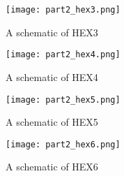 \documentclass{article}
\begin{document}
\begin{enumerate}
\begin{figure}[ht!]
    \centering
    \texttt{[image: part2\_hex3.png]}
    \caption{A schematic of HEX3}
    \label{f:part2_hex3}
\end{figure}

\begin{figure}[ht!]
    \centering
    \texttt{[image: part2\_hex4.png]}
    \caption{A schematic of HEX4}
    \label{f:part2_hex4}
\end{figure}

\begin{figure}[ht!]
    \centering
    \texttt{[image: part2\_hex5.png]}
    \caption{A schematic of HEX5}
    \label{f:part2_hex5}
\end{figure}

\begin{figure}[ht!]
    \centering
    \texttt{[image: part2\_hex6.png]}
    \caption{A schematic of HEX6}
    \label{f:part2_hex6}
\end{figure}

\end{enumerate}
\end{document}
